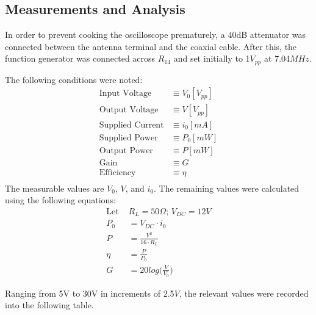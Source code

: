 \subsection{Measurements and Analysis}
In order to prevent cooking the oscilloscope prematurely, a 40dB attenuator was connected
between the antenna terminal and the coaxial cable. After this, the function
generator was connected across $R_{14}$ and set initially to 1$V_{pp}$ at
7.04$MHz$.

The following conditions were noted:
\begin{align*}
  \text{Input Voltage} &\equiv        V_0[V_{pp}]\\
  \text{Output Voltage} &\equiv       V[V_{pp}]\\
  \text{Supplied Current} &\equiv     i_0[mA]\\
  \text{Supplied Power} &\equiv       P_0[mW]\\
  \text{Output Power} &\equiv         P[mW]\\
  \text{Gain} &\equiv                 G\\
  \text{Efficiency} &\equiv           \eta\\
\end{align*}
The measurable values are $V_0$, $V$, and $i_0$. The remaining values were
calculated using the following equations:
\begin{align*}
  \text{Let } & R_L=50\Omega;\, V_{DC}=12V\\
  P_0   &=  V_{DC}\cdot i_0\\
  P     &=  \frac{V^2}{16\cdot R_L}\\
  \eta  &=  \frac{P}{P_0}\\
  G     &=  20log \bigg( \frac{V}{V_0} \bigg)
\end{align*}

Ranging from 5V to 30V in increments of 2.5$V$, the relevant values were
recorded into the following table.

